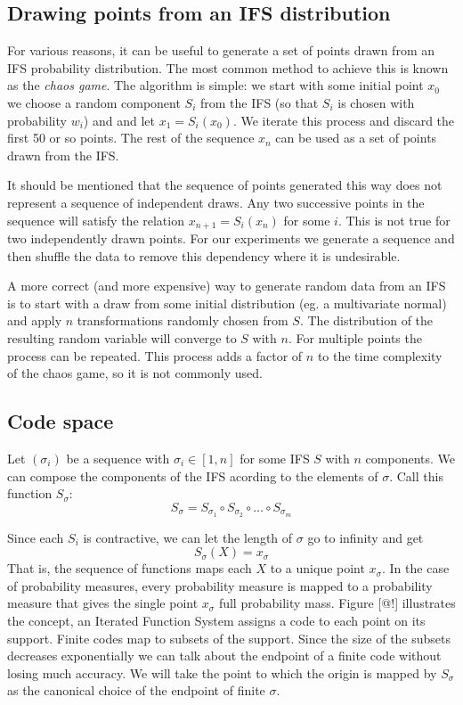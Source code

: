 \documentclass[10pt,a4paper,oneside]{article}
\theoremstyle{definition}
\begin{document}
\subsection*{Drawing points from an IFS distribution}

For various reasons, it can be useful to generate a set of points drawn from an IFS probability distribution. The most common method to achieve this is known as the \emph{chaos game}. The algorithm is simple: we start with some initial point $x_0$ we choose a random component $S_i$ from the IFS (so that $S_i$ is chosen with probability $w_i$) and and let $x_1 = S_i(x_0)$. We iterate this process and discard the first 50 or so points. The rest of the sequence $x_n$ can be used as a set of points drawn from the IFS.

It should be mentioned that the sequence of points generated this way does not represent a sequence of independent draws. Any two successive points in the sequence will satisfy the relation $x_{n+1} = S_i(x_{n})$ for some $i$. This is not true for two independently drawn points. For our experiments we generate a sequence and then shuffle the data to remove this dependency where it is undesirable.

A more correct (and more expensive) way to generate random data from an IFS is to start with a draw from some initial distribution (eg. a multivariate normal) and apply $n$ transformations randomly chosen from $S$. The distribution of the resulting random variable will converge to $S$ with $n$. For multiple points the process can be repeated. This process adds a factor of $n$ to the time complexity of the chaos game, so it is not commonly used. 

\subsection*{Code space}
\label{sec:code-space}

Let $(\sigma_i)$ be a sequence with $\sigma_i \in [1, n]$ for some IFS $S$ with $n$ components. We can compose the components of the IFS acording to the elements of $\sigma$. Call this function $S_\sigma$:
\[
S_\sigma = S_{\sigma_1} \circ S_{\sigma_2} \circ \ldots \circ S_{\sigma_m}
\]

Since each $S_i$ is contractive, we can let the length of $\sigma$ go to infinity and get 
\[
S_\sigma(X) = x_\sigma  
\] 
That is, the sequence of functions maps each $X$ to a unique point $x_\sigma$. In the case of probability measures, every probability measure is mapped to a probability measure that gives the single point $x_\sigma$ full probability mass. Figure [@!] illustrates the concept, an Iterated Function System assigns a code to each point on its support. Finite codes map to subsets of the support. Since the size of the subsets decreases exponentially we can talk about the endpoint of a finite code without losing much accuracy. We will take the point to which the origin is mapped by $S_\sigma$ as the canonical choice of the endpoint of finite $\sigma$.
\end{document}
